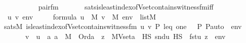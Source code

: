 \begin{isabellebody}
\ \ \ \ \ \ {}{\isacharparenright}{\kern0pt}{\isacharcomma}{\kern0pt}\isanewline
\ \ \ \ \ \ pair{\isacharunderscore}{\kern0pt}fm{\isacharparenleft}{\kern0pt}{}{\isacharcomma}{\kern0pt}\ {}{\isacharcomma}{\kern0pt}\ {}{\isacharparenright}{\kern0pt}\ \isanewline
\ \ {\isacharparenright}{\kern0pt}{\isacharparenright}{\kern0pt}{\isacharparenright}{\kern0pt}{\isacharparenright}{\kern0pt}{\isacharparenright}{\kern0pt}{\isacharparenright}{\kern0pt}{\isachardoublequoteclose}\isanewline
\isanewline
\isanewline
\isanewline
\isanewline
{}\isamarkupfalse%
\ sats{\isacharunderscore}{\kern0pt}is{\isacharunderscore}{\kern0pt}least{\isacharunderscore}{\kern0pt}index{\isacharunderscore}{\kern0pt}of{\isacharunderscore}{\kern0pt}Vset{\isacharunderscore}{\kern0pt}contains{\isacharunderscore}{\kern0pt}witness{\isacharunderscore}{\kern0pt}fm{\isacharunderscore}{\kern0pt}iff\ {\isacharcolon}{\kern0pt}\ \isanewline
\ \ \ {\isasymphi}\ u\ v\ env\isanewline
\ \ \ {\isachardoublequoteopen}{\isasymphi}\ {\isasymin}\ formula{\isachardoublequoteclose}\ {\isachardoublequoteopen}u\ {\isasymin}\ M{\isachardoublequoteclose}\ {\isachardoublequoteopen}v\ {\isasymin}\ M{\isachardoublequoteclose}\ {\isachardoublequoteopen}env\ {\isasymin}\ list{\isacharparenleft}{\kern0pt}M{\isacharparenright}{\kern0pt}{\isachardoublequoteclose}\ \isanewline
\ \ \ {\isachardoublequoteopen}sats{\isacharparenleft}{\kern0pt}M{\isacharcomma}{\kern0pt}\ is{\isacharunderscore}{\kern0pt}least{\isacharunderscore}{\kern0pt}index{\isacharunderscore}{\kern0pt}of{\isacharunderscore}{\kern0pt}Vset{\isacharunderscore}{\kern0pt}contains{\isacharunderscore}{\kern0pt}witness{\isacharunderscore}{\kern0pt}fm{\isacharparenleft}{\kern0pt}{\isasymphi}{\isacharparenright}{\kern0pt}{\isacharcomma}{\kern0pt}\ {\isacharbrackleft}{\kern0pt}u{\isacharcomma}{\kern0pt}\ v{\isacharcomma}{\kern0pt}\ P{\isacharcomma}{\kern0pt}\ leq{\isacharcomma}{\kern0pt}\ one{\isacharcomma}{\kern0pt}\ {\isacharless}{\kern0pt}{\isasymF}{\isacharcomma}{\kern0pt}\ {\isasymG}{\isacharcomma}{\kern0pt}\ P{\isacharcomma}{\kern0pt}\ P{\isacharunderscore}{\kern0pt}auto{\isachargreater}{\kern0pt}{\isacharbrackright}{\kern0pt}\ {\isacharat}{\kern0pt}\ env{\isacharparenright}{\kern0pt}\ \isanewline
\ \ \ \ \ \ \ \ {\isasymlongleftrightarrow}\ v\ {\isacharequal}{\kern0pt}\ {\isacharless}{\kern0pt}u{\isacharcomma}{\kern0pt}\ {\isasymmu}\ a{\isachardot}{\kern0pt}\ a\ {\isasymin}\ M\ {\isasymand}\ Ord{\isacharparenleft}{\kern0pt}a{\isacharparenright}{\kern0pt}\ {\isasymand}\ {\isacharparenleft}{\kern0pt}{\isasymexists}z\ {\isasymin}\ MVset{\isacharparenleft}{\kern0pt}a{\isacharparenright}{\kern0pt}\ {\isasyminter}\ HS{\isachardot}{\kern0pt}\ snd{\isacharparenleft}{\kern0pt}u{\isacharparenright}{\kern0pt}\ {\isasymtturnstile}HS\ {\isasymphi}\ {\isacharparenleft}{\kern0pt}{\isacharbrackleft}{\kern0pt}fst{\isacharparenleft}{\kern0pt}u{\isacharparenright}{\kern0pt}{\isacharcomma}{\kern0pt}\ z{\isacharbrackright}{\kern0pt}\ {\isacharat}{\kern0pt}\ env{\isacharparenright}{\kern0pt}{\isacharparenright}{\kern0pt}{\isachargreater}{\kern0pt}{\isachardoublequoteclose}\ \ \isanewline

\end{isabellebody}
